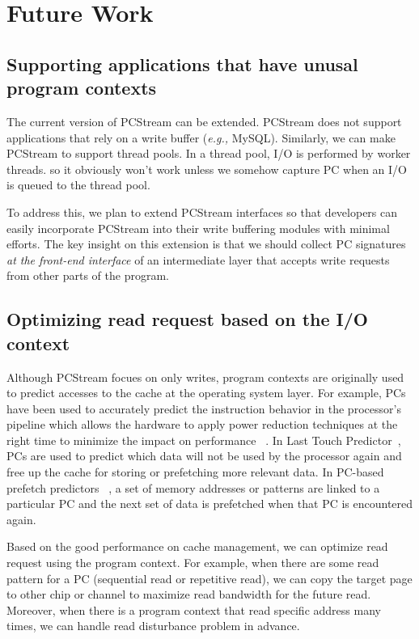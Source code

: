 \section{Future Work}
\subsection{Supporting applications that have unusal program contexts}

The current version of \textsf{\small PCStream} can be extended.
\textsf{\small PCStream} does not support applications that
rely on a write buffer ({\it e.g.,} MySQL). 
Similarly, we can make PCStream to support thread pools.
In a thread pool, I/O is performed by worker threads.  
so it obviously won't work unless we somehow capture PC when an I/O is  
queued to the thread pool.

To address this, we plan to extend
\textsf{\small PCStream} interfaces so that developers can easily incorporate
\textsf{\small PCStream} into their write buffering modules with minimal
efforts.  
The key insight on this extension is that we should
collect PC signatures {\it at the front-end interface} of an intermediate layer that accepts write
requests from other parts of the program.


\subsection{Optimizing read request based on the I/O context}
Although PCStream focues on only writes, program contexts are originally
used to predict accesses to the cache at the operating system layer.
For example, PCs have been used to accurately predict
the instruction behavior in the processor's pipeline
which allows the hardware to apply power reduction techniques
at the right time to minimize the impact on performance~\cite{cacheenergy}
. In Last Touch Predictor~\cite{cachemngmt}, PCs are
used to predict which data will not be used by the processor
again and free up the cache for storing or prefetching
more relevant data. In PC-based prefetch predictors~\cite{memoryprefetching}
, a set of memory addresses or
patterns are linked to a particular PC and the next set of
data is prefetched when that PC is encountered again.

Based on the good performance on cache management, we can optimize
read request using the program context. For example, when there are 
some read pattern for a PC (sequential read or repetitive read), we can 
copy the target page to other chip or channel to maximize read bandwidth
for the future read.
Moreover, when there is a program context that read specific address many times,
we can handle read disturbance problem in advance.


